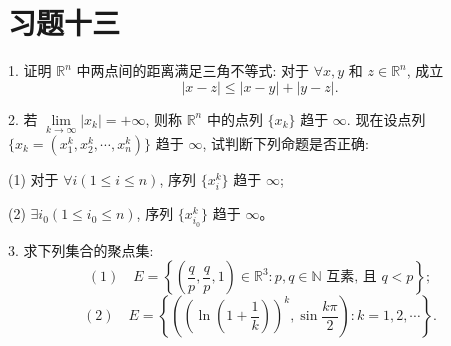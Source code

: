 \documentclass[UTF8, 12pt, fontset=fandol, oneside]{ctexart}
\begin{document}
\section*{习题十三}

1. 证明 $\mathbb R^n$ 中两点间的距离满足三角不等式: 对于 $\forall x,y$ 和 $z\in\mathbb R^n$, 成立
\[
  |x-z|\le |x-y|+|y-z|.
\]

2. 若 $\lim\limits_{k\to\infty}|x_k|=+\infty$, 则称 $\mathbb R^n$ 中的点列 $\{x_k\}$ 趋于 $\infty$. 现在设点列 $\{x_k=(x_1^k,x_2^k,\cdots,x_n^k)\}$ 趋于 $\infty$, 试判断下列命题是否正确:

(1) 对于 $\forall i(1\le i\le n)$, 序列 $\{x_i^k\}$ 趋于 $\infty$;

(2) $\exists i_0(1\le i_0\le n)$, 序列 $\{x_{i_0}^k\}$ 趋于 $\infty$。

3. 求下列集合的聚点集:
\[
  (1)\quad E=\left\{\left(\frac qp,\frac qp,1\right)\in\mathbb R^3:p,q\in\mathbb N\text{ 互素, 且 }q<p\right\};
\]
\[
  (2)\quad E=\left\{\left(\left(\ln\left(1+\frac1k\right)\right)^k,\sin\frac{k\pi}{2}\right):k=1,2,\cdots\right\}.
\]
\end{document}
